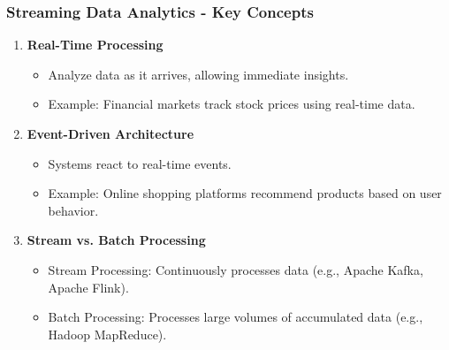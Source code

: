 \documentclass[aspectratio=169]{beamer}
\begin{document}
\begin{frame}[fragile]
    \frametitle{Streaming Data Analytics - Key Concepts}
    \begin{enumerate}
        \item \textbf{Real-Time Processing}
            \begin{itemize}
                \item Analyze data as it arrives, allowing immediate insights.
                \item Example: Financial markets track stock prices using real-time data.
            \end{itemize}

        \item \textbf{Event-Driven Architecture}
            \begin{itemize}
                \item Systems react to real-time events. 
                \item Example: Online shopping platforms recommend products based on user behavior.
            \end{itemize}

        \item \textbf{Stream vs. Batch Processing}
            \begin{itemize}
                \item Stream Processing: Continuously processes data (e.g., Apache Kafka, Apache Flink).
                \item Batch Processing: Processes large volumes of accumulated data (e.g., Hadoop MapReduce).
            \end{itemize}
    \end{enumerate}
\end{frame}
\end{document}
